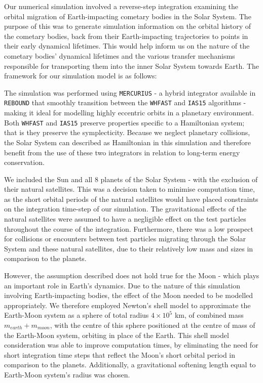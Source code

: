 Our numerical simulation involved a reverse-step integration examining the orbital migration of Earth-impacting cometary bodies in the Solar System.
The purpose of this was to generate simulation information on the orbital history of the cometary bodies, back from their Earth-impacting trajectories to points in their early dynamical lifetimes. This would help inform us on the nature of the cometary bodies' dynamical lifetimes and the various transfer mechanisms responsible for transporting them into the inner Solar System towards Earth. The framework for our simulation model is as follows:

The simulation was performed using \texttt{MERCURIUS} - a hybrid integrator available in \texttt{REBOUND} that smoothly transition between the \texttt{WHFAST} \citep{2015MNRAS.452..376R} and \texttt{IAS15} \citep{2015MNRAS.446.1424R} algorithms - making it ideal for modelling highly eccentric orbits in a planetary environment. Both \texttt{WHFAST} and \texttt{IAS15} preserve properties specific to a Hamiltonian system; that is they preserve the symplecticity. Because we neglect planetary collisions, the Solar System can described as Hamiltonian in this simulation and therefore benefit from the use of these two integrators in relation to long-term energy conservation.

We included the Sun and all 8 planets of the Solar System - with the exclusion of their natural satellites. This was a decision taken to minimise computation time, as the short orbital periods of the natural satellites would have placed constraints on the integration time-step of our simulation. The gravitational effects of the natural satellites were assumed to have a negligible effect on the test particles throughout the course of the integration. Furthermore, there was a low prospect for collisions or encounters between test particles migrating through the Solar System and these natural satellites, due to their relatively low mass and sizes in comparison to the planets.

However, the assumption described does not hold true for the Moon - which plays an important role in Earth's dynamics. Due to the nature of this simulation involving Earth-impacting bodies, the effect of the Moon needed to be modelled appropriately. We therefore employed Newton's shell model to approximate the Earth-Moon system as a sphere of total radius $4\times10^5$ km, of combined mass $m_{earth}+m_{moon}$, with the centre of this sphere positioned at the centre of mass of the Earth-Moon system, orbiting in place of the Earth. This shell model consideration was able to improve computation times, by eliminating the need for short integration time steps that reflect the Moon's short orbital period in comparison to the planets. Additionally, a gravitational softening length equal to Earth-Moon system's radius was chosen.

